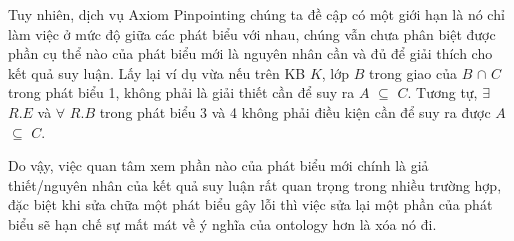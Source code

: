 \hspace*{0.05\textwidth} Tuy nhiên, dịch vụ Axiom Pinpointing chúng ta đề cập có một giới hạn là nó chỉ làm việc ở mức độ giữa các phát biểu với nhau, chúng vẫn chưa phân biệt được phần cụ thể nào của phát biểu mới là nguyên nhân cần và đủ để giải thích cho kết quả suy luận. Lấy lại ví dụ vừa nếu trên KB $K$, lớp $B$ trong giao của $B$ $\cap$ $C$ trong phát biểu 1, không phải là giải thiết cần để suy ra $A$ $\subseteq$ $C$. Tương tự, $\exists$ $R.E$ và $\forall$ $R.B$ trong phát biểu 3 và 4 không phải điều kiện cần để suy ra được $A$ $\subseteq$ $C$. 

\hspace{0.05\textwidth} Do vậy, việc quan tâm xem phần nào của phát biểu mới chính là giả thiết/nguyên nhân của kết quả suy luận rất quan trọng trong nhiều trường hợp, đặc biệt khi sửa chữa một phát biểu gây lỗi thì việc sửa lại một phần của phát biểu sẽ hạn chế sự mất mát về ý nghĩa của ontology hơn là xóa nó đi.

